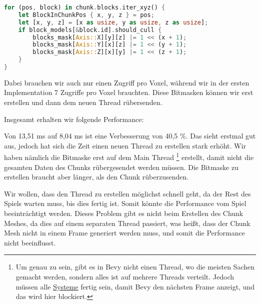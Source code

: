 \begin{lstlisting}[language=Rust]
for (pos, block) in chunk.blocks.iter_xyz() {
	let BlockInChunkPos { x, y, z } = pos;
	let [x, y, z] = [x as usize, y as usize, z as usize];
	if block_models[&block.id].should_cull {
		blocks_mask[Axis::X][y][z] |= 1 << (x + 1);
		blocks_mask[Axis::Y][x][z] |= 1 << (y + 1);
		blocks_mask[Axis::Z][x][y] |= 1 << (z + 1);
	}
}
\end{lstlisting}

Dabei brauchen wir auch nur einen Zugriff pro Voxel,
während wir in der ersten Implementation 7 Zugriffe
pro Voxel brauchten.
Diese Bitmasken können wir erst erstellen und
dann dem neuen Thread rübersenden.


Insgesamt erhalten wir folgende Performance:

\vspace{0.3cm}


\vspace{0.3cm}

Von 13,51 ms auf 8,04 ms ist eine Verbesserung
von 40,5 \%. Das sieht erstmal gut aus,
jedoch hat sich die Zeit einen neuen Thread zu
erstellen stark erhöht. Wir haben nämlich die Bitmaske
erst auf dem Main Thread
\footnote{Um genau zu sein, gibt es in Bevy
nicht einen  Thread, wo die meisten Sachen
gemacht werden, sondern alles ist auf mehrere Threads
verteilt. Jedoch müssen alle
\href{https://bevy-cheatbook.github.io/programming/systems.html}{Systeme}
\cite{bevy_systems} fertig sein, damit Bevy den nächsten
Frame anzeigt, und das wird hier blockiert.}
erstellt, damit nicht die
gesamten Daten des Chunks rübergesendet werden müssen.
Die Bitmaske zu erstellen braucht aber länger,
als den Chunk rüberzusenden.

Wir wollen, dass den Thread zu erstellen möglichst
schnell geht, da der Rest des Spiels warten muss,
bis dies fertig ist. Somit könnte die Performance
vom Spiel beeinträchtigt werden. Dieses Problem gibt
es nicht beim Erstellen des Chunk Meshes, da dies auf
einem separaten Thread passiert, was heißt, dass der
Chunk Mesh nicht in einem Frame generiert werden muss,
und somit die Performance nicht beeinflusst.

